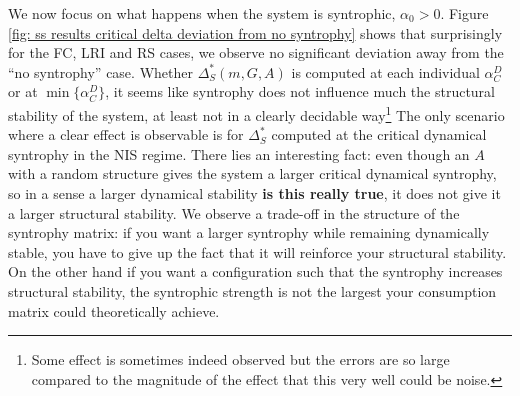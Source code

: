 \documentclass[12pt, titlepage]{report}
\begin{document}
We now focus on what happens when the system is syntrophic, \ie $\alpha_0 > 0$. Figure \ref{fig: ss results critical delta deviation from no syntrophy} shows that surprisingly for the FC, LRI and RS cases, we observe no significant deviation away from the ``no syntrophy'' case. Whether $\Delta_S^*(m, G, A)$ is computed at each individual $\alpha_C^D$ or at $\min\{\alpha_C^D\}$, it seems like syntrophy does not influence much the structural stability of the system, at least not in a clearly decidable way\footnote{Some effect is sometimes indeed observed but the errors are so large compared to the magnitude of the effect that this very well could be noise.} The only scenario where a clear effect is observable is for $\Delta_S^*$ computed at the critical dynamical syntrophy in the NIS regime. There lies an interesting fact: even though an $A$ with a random structure gives the system a larger critical dynamical syntrophy, so in a sense a larger dynamical stability \textbf{is this really true}, it does not give it a larger structural stability. We observe a trade-off in the structure of the syntrophy matrix: if you want a larger syntrophy while remaining dynamically stable, you have to give up the fact that it will reinforce your structural stability. On the other hand if you want a configuration such that the syntrophy increases structural stability, the syntrophic strength is not the largest your consumption matrix could theoretically achieve.
\end{document}
